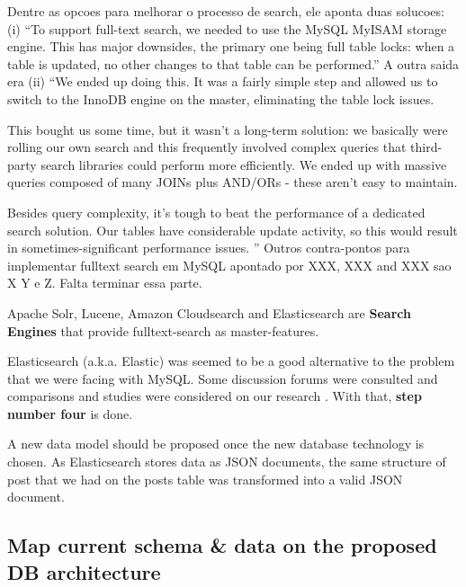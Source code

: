 	Dentre as opcoes para melhorar o processo de search, ele aponta duas solucoes: (i) ``To support full-text search, we needed to use the MySQL MyISAM storage engine. This has major downsides, the primary one being full table locks: when a table is updated, no other changes to that table can be performed.'' A outra saida era (ii) ``We ended up doing this. It was a fairly simple step and allowed us to switch to the InnoDB engine on the master, eliminating the table lock issues.

	This bought us some time, but it wasn't a long-term solution: we basically were rolling our own search and this frequently involved complex queries that third-party search libraries could perform more efficiently. We ended up with massive queries composed of many JOINs plus AND/ORs - these aren't easy to maintain.

	Besides query complexity, it's tough to beat the performance of a dedicated search solution. Our tables have considerable update activity, so this would result in sometimes-significant performance issues.
	''
	Outros contra-pontos para implementar fulltext search em MySQL apontado por XXX, XXX and XXX sao X Y e Z. Falta terminar essa parte.

	Apache Solr, Lucene, Amazon Cloudsearch and Elasticsearch are \textbf{Search Engines} that provide fulltext-search as master-features. 

	Elasticsearch (a.k.a. Elastic) was seemed to be a good alternative to the problem that we were facing with MySQL. Some discussion forums were consulted and comparisons and studies were considered on our research \cite{StackOverflowElastic} \cite{SolrVsES} \cite{quoraES}. With that, \textbf{step number four} is done. 

	A new data model should be proposed once the new database technology is chosen. As Elasticsearch stores data as JSON documents, the same structure of post that we had on the posts table was transformed into a valid JSON document.























\clearpage
\subsection{Map current schema \& data on the proposed DB architecture}

